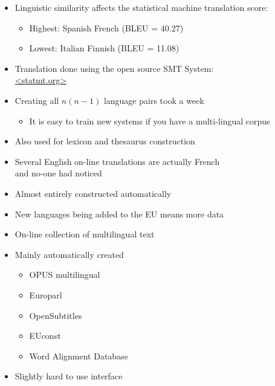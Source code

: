 \documentclass[a4paper,landscape,headrule,footrule,dvips]{foils}
\begin{document}
\begin{CJK}{UTF8}{min}

\begin{itemize}
\item Linguistic similarity affects the statistical machine translation score:
  \begin{itemize}
  \item Highest: Spanish \into French (BLEU = 40.27)
  \item Lowest: Italian \into Finnish  (BLEU = 11.08)
  \end{itemize}

\item Translation done using the open source SMT System:
 \\  \url{<statmt.org>}

\item Creating all $n(n-1)$ language pairs took a week
  \begin{itemize}
  \item It is easy to train new systems if you have a multi-lingual corpus
  \end{itemize}
\end{itemize}


\begin{itemize}
\item Also used for lexicon and thesaurus construction
\item Several English on-line translations are actually French
  \\ and no-one had noticed 
\item Almost entirely constructed automatically
\item New languages being added to the EU means more data
\end{itemize}



\begin{itemize}
\item On-line collection of multilingual text
\item Mainly automatically created
  \begin{itemize}
  \item  OPUS multilingual 
  \item Europarl 
  \item OpenSubtitles 
  \item EUconst 
  \item Word Alignment Database
  \end{itemize}
\item Slightly hard to use interface
\end{itemize}


\end{CJK}
\end{document}
